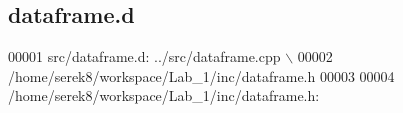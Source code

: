 \hypertarget{dataframe_8d}{\subsection{dataframe.\-d}
\label{dataframe_8d}
}

\begin{DoxyCode}
00001 src/dataframe.d: ../src/dataframe.cpp \(\backslash\)
00002  /home/serek8/workspace/Lab\_1/inc/dataframe.h
00003 
00004 /home/serek8/workspace/Lab\_1/inc/dataframe.h:
\end{DoxyCode}
